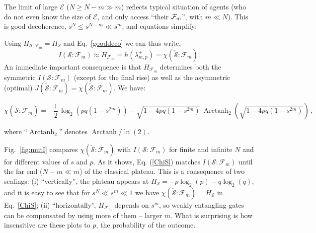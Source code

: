 \documentclass[aps,prl,showpacs,amsmath,amssymb,amsfonts,lengthcheck,twocolumn,longbibliography,superscriptaddress]{revtex4-2}
\newcommand{\ket}[1]    {| #1 \rangle}
\newcommand{\cS}        {{\mathcal S}}
\newcommand{\cE}        {{\mathcal E}}
\newcommand{\+}         {\dagger}
\newcommand\cF{{\mathcal F}}
\newcommand\hocom[1]{}%
\newcommand{\ba}{\begin{eqnarray}}
\newcommand{\ea}{\end{eqnarray}}
\newcommand{\mc}[1]{\mathcal{#1}}
\begin{document}
The limit of large $\cE$ ($N \ge N-m \gg m$) reflects typical situation of agents (who do not even know the size of $\cE$, and only access ``their ${\cal F}_m$'', with $m \ll N$). This is  good decoherence, $s^N \le s^{N-m} \ll s^m$, and equations simplify:  
\hocom{As already noted, $H_{\cS,\cF_m} = H_{\cS}$.
Therefore;
\ba
I(\mc{S}:\mc{F}_m) \approx H_{\mc{F}_m}={h}(\lambda^{+}_{m,p}) = 
J(\check \cS : \mc{F}_m)=
\chi(\check \cS : \mc{F}_m) . \ \ \ \ \ \ 
\label{Mutinfo}
\ea
The equality $J(\check{\mc{S}}:\mc{F}_m)\approx I(\mc{S}:\mc{F}_m)$ assumes optimal measurements on $\check \cS$. 
In case of good decoherence
measurements of the pointer states are optimal \cite{ZQZ10}.

Indeed, for model and for good decoherence \cite{blume2005simple,ZQZ10} measuring the pointer observable of $\cS$ is actually optimal \cite{ZQZ10}. Observe in Eq.~\eqref{bstate} that in the pointer basis $\{\ket {0_\cS}, \ket {1_\cS}\}$ the conditional entropy disappears, $H_{{\cF_m} | {\check \cS}} = 0$, since all states of $\cF_m$ correlated with the pointer states of $\cS$ are pure. Moreover, good decoherence, $s^N \le s^{N-m} \ll s^m$, is equivalent to large environments, $N \ge N-m \gg m$. 
}
Using $H_{\cS,\cF_m} = H_{\cS}$ and Eq.~\eqref{gooddeco} we can thus write,
\begin{equation}
I(\mc{S}:\mc{F}_m) \approx H_{\mc{F}_m}={h}(\lambda^{+}_{m,p}) =\chi(\check \cS : \mc{F}_m). 
\label{Mutinfo}
\end{equation}
An immediate important consequence is that  $H_{\cF_m}$ determines both the symmetric $I(\mc{S}:\mc{F}_m)$ (except for the final rise) as well as the asymmetric (optimal) $J(\check \cS : \mc{F}_m)=\chi(\check \cS : \mc{F}_m)$. We have:
\begin{widetext}
\begin{equation}
\chi(\check \cS : \mc{F}_m)=-\frac{1}{2}\,\log _{2}\left( p q\left(1-s^{2 m}\right) \right)-\sqrt{1-4p q\left(1-s^{2 m}\right)}\, \operatorname{Arctanh}_{2}\left(\sqrt{1-4p q\left(1-s^{2 m}\right)}\right)\,,
\label{ChiS}
\end{equation}
\end{widetext}
where ``$\operatorname{Arctanh}_2$'' denotes $\operatorname{Arctanh}/\ln(2)$.

Fig.~\ref{fig:mutI} compares  $\chi(\check{\mc{S}}:\mc{F}_m)$ with ${I}(\mc{S}:\mc{F}_m)$ for finite  and infinite $N$ and for different values of $s$ and $p$. 
As it shows, Eq. (\ref{ChiS}) matches $I(\mc{S}:\mc{F}_m)$ until the far end ($N-m \ll m$) of the classical plateau. This is a consequence of two scalings: (i) ``vertically'', the plateau appears at $H_\cS = -p\log_2( p) - q \log_2 (q)$, and it is easy to see that for  $s^N \ll s^m \ll 1$ we have $\chi(\check{\mc{S}}:\mc{F}_m)=H_\cS$ in Eq.~\eqref{ChiS}; (ii) ``horizontally",  $H_{\mc{F}_m}$ depends on $s^m$, so weakly entangling gates can be compensated by using more of them -- larger $m$. What is surprising is how insensitive are these plots to $p$, the probability of the outcome.
\end{document}
